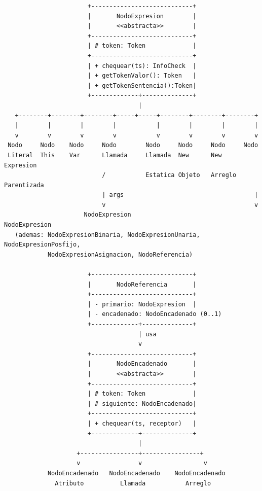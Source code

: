 \documentclass[11pt,a4paper]{article}
\begin{document}
{\footnotesize
\begin{verbatim}
                       +----------------------------+
                       |       NodoExpresion        |
                       |       <<abstracta>>        |
                       +----------------------------+
                       | # token: Token             |
                       +----------------------------+
                       | + chequear(ts): InfoCheck  |
                       | + getTokenValor(): Token   |
                       | + getTokenSentencia():Token|
                       +-------------+--------------+
                                     |
   +--------+--------+--------+-----+-----+--------+--------+--------+
   |        |        |        |           |        |        |        |
   v        v        v        v           v        v        v        v
 Nodo     Nodo    Nodo     Nodo        Nodo     Nodo     Nodo     Nodo
 Literal  This    Var      Llamada     Llamada  New      New      Expresion
                           /           Estatica Objeto   Arreglo  Parentizada
                           | args                                    |
                           v                                         v
                      NodoExpresion                          NodoExpresion
   (ademas: NodoExpresionBinaria, NodoExpresionUnaria, NodoExpresionPosfijo,
            NodoExpresionAsignacion, NodoReferencia)

                       +----------------------------+
                       |       NodoReferencia       |
                       +----------------------------+
                       | - primario: NodoExpresion  |
                       | - encadenado: NodoEncadenado (0..1)
                       +-------------+--------------+
                                     | usa
                                     v
                       +----------------------------+
                       |       NodoEncadenado       |
                       |       <<abstracta>>        |
                       +----------------------------+
                       | # token: Token             |
                       | # siguiente: NodoEncadenado|
                       +----------------------------+
                       | + chequear(ts, receptor)   |
                       +-------------+--------------+
                                     |
                    +----------------+----------------+
                    v                v                 v
            NodoEncadenado   NodoEncadenado    NodoEncadenado
              Atributo          Llamada           Arreglo


\end{verbatim}}
\end{document}
